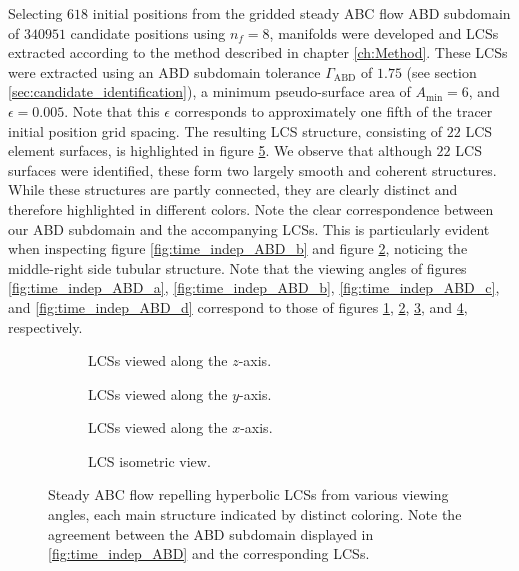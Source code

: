 Selecting $618$ initial positions from the gridded steady ABC flow ABD subdomain of $340951$ candidate positions using $n_f=8$, manifolds were developed and LCSs extracted according to the method described in chapter \ref{ch:Method}. These LCSs were extracted using an ABD subdomain tolerance $\Gamma_{\text{ABD}}$ of $1.75$ (see section \ref{sec:candidate_identification}), a minimum pseudo-surface area of $A_{\text{min}}=6$, and $\epsilon=0.005$. Note that this $\epsilon$ corresponds to approximately one fifth of the tracer initial position grid spacing. The resulting LCS structure, consisting of $22$ LCS element surfaces, is highlighted in figure \ref{fig:time_indep_LCS}. We observe that although $22$ LCS surfaces were identified, these form two largely smooth and coherent structures. While these structures are partly connected, they are clearly distinct and therefore highlighted in different colors. Note the clear correspondence between our ABD subdomain and the accompanying LCSs. This is particularly evident when inspecting figure \ref{fig:time_indep_ABD_b} and figure \ref{fig:time_indep_LCS_b}, noticing the middle-right side tubular structure. Note that the viewing angles of figures \ref{fig:time_indep_ABD_a}, \ref{fig:time_indep_ABD_b}, \ref{fig:time_indep_ABD_c}, and \ref{fig:time_indep_ABD_d} correspond to those of figures \ref{fig:time_indep_LCS_a}, \ref{fig:time_indep_LCS_b}, \ref{fig:time_indep_LCS_c}, and \ref{fig:time_indep_LCS_d}, respectively. 

\begin{figure}[h!] 

\centering
\begin{subfigure}[b]{0.45\textwidth}
\centering

\caption{LCSs viewed along the $z$-axis.}\label{fig:time_indep_LCS_a}
\end{subfigure}
\begin{subfigure}[b]{0.45\textwidth}
\centering

\caption{LCSs viewed along the $y$-axis.}\label{fig:time_indep_LCS_b}
\end{subfigure}
\begin{subfigure}[b]{0.45\textwidth}
\centering

\caption{LCSs viewed along the $x$-axis.}\label{fig:time_indep_LCS_c}
\end{subfigure}
\begin{subfigure}[b]{0.45\textwidth}
\centering

\caption{LCS isometric view.}\label{fig:time_indep_LCS_d}
\end{subfigure}

\caption{Steady ABC flow repelling hyperbolic LCSs from various viewing angles, each main structure indicated by distinct coloring. Note the agreement between the ABD subdomain displayed in \ref{fig:time_indep_ABD} and the corresponding LCSs.}\label{fig:time_indep_LCS}
\end{figure}

